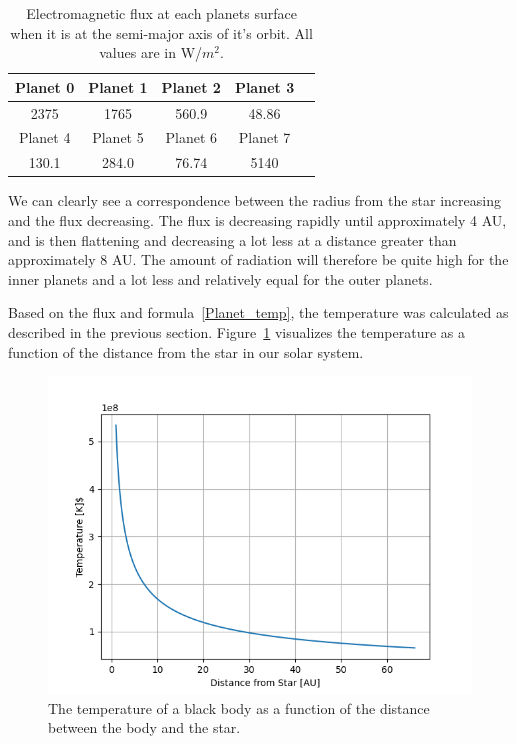 \documentclass[reprint,english,notitlepage]{revtex4-2}
\begin{document}
	\begin{table}[h]
	    \begin{tabular}{|c|c|c|c|c|}
	        \hline
			Planet 0 & Planet 1 & Planet 2 & Planet 3\\
	        \hline
			2375 & 1765 & 560.9 & 48.86\\
			\hline\hline
			Planet 4 & Planet 5 & Planet 6 & Planet 7\\
	        \hline
			130.1 & 284.0 & 76.74 & 5140\\
			\hline
	    \end{tabular}
	    \caption{Electromagnetic flux at each planets surface when it is at the semi-major axis of it's orbit. All values are in W/$m^2$.}
	    \label{tab:planet_flux}
	\end{table}

	We can clearly see a correspondence between the radius from the star increasing and the flux decreasing.
	The flux is decreasing rapidly until approximately 4 AU, and is then flattening and decreasing a lot less at a distance greater than approximately 8 AU.
	The amount of radiation will therefore be quite high for the inner planets and a lot less and relatively equal for the outer planets.

	Based on the flux and formula~\eqref{Planet_temp}, the temperature was calculated as described in the previous section.
	Figure~\ref{fig:Radius_Temp} visualizes the temperature as a function of the distance from the star in our solar system.

	\begin{figure}[h]
		\centering
		\includegraphics[scale=0.4]{Figures/Radius_temp}
		\caption{The temperature of a black body as a function of the distance between the body and the star.}\label{fig:Radius_Temp}
	\end{figure}
\end{document}
